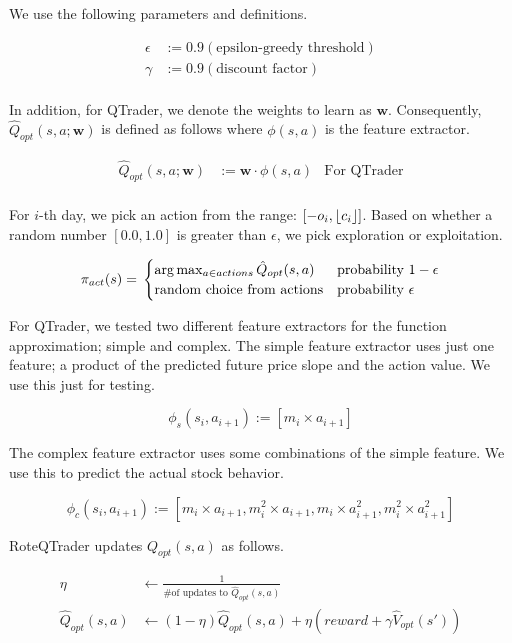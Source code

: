 \documentclass[twocolumn,10pt]{asme2ej}
\newcommand{\vect}[1]{\boldsymbol{#1}}
\DeclarePairedDelimiter\floor{\lfloor}{\rfloor}
\begin{document}
We use the following parameters and definitions.

\begin{align*}
  \epsilon &:= 0.9 (\text{epsilon-greedy threshold}) \\
  \gamma &:= 0.9 (\text{discount factor}) \\
\end{align*}

In addition, for QTrader, we denote the weights to learn as $\vect{w}$. Consequently, $\hat{Q}_{opt}(s, a; \vect{w})$ is
defined as follows where $\phi(s,a)$ is the feature extractor.

\begin{align*}
  \hat{Q}_{opt}(s, a; \vect{w}) &:= \vect{w} \cdot \phi(s, a) & \text{For QTrader}\\
\end{align*}

For $i$-th day, we pick an action from the range: $[-o_i,\floor*{c_i}]$. Based on whether a random number $[0.0, 1.0]$
is greater than $\epsilon$, we pick exploration or exploitation.

\[
  \pi_{act}(s) = \\
  \begin{cases}
    \arg \max_{a \in actions}\hat{Q}_{opt}(s, a) & \text{probability } 1-\epsilon \\
    \text{random choice from actions} & \text{probability } \epsilon \\
  \end{cases}
\]

For QTrader, we tested two different feature extractors for the
function approximation; simple and complex. The simple feature
extractor uses just one feature; a product of the predicted future
price slope and the action value. We use this just for testing.

\[
\phi_s(s_i,a_{i+1}) := [m_i \times a_{i+1}]
\]

The complex feature extractor uses some combinations of the simple feature. We
use this to predict the actual stock behavior.

\[
\phi_c(s_i,a_{i+1}) := [m_i \times a_{i+1}, m_i^2 \times a_{i+1}, m_i \times a_{i+1}^2, m_i^2 \times a_{i+1}^2 ]
\]

RoteQTrader updates $Q_{opt}(s,a)$ as follows.

\begin{align*}
  \eta &\gets \frac{1}{\text{\# of updates to }\hat{Q}_{opt}(s, a)} \\
  \hat{Q}_{opt}(s, a)&\gets (1-\eta)\hat{Q}_{opt}(s,a) + \eta\left(reward + \gamma \hat{V}_{opt}(s')\right)
\end{align*}
\end{document}
